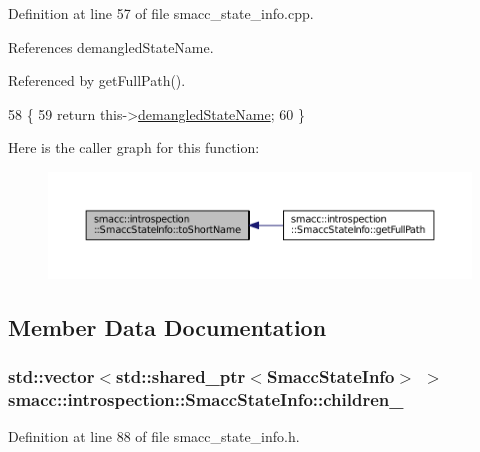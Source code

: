 Definition at line 57 of file smacc\+\_\+state\+\_\+info.\+cpp.



References demangled\+State\+Name.



Referenced by get\+Full\+Path().


\begin{DoxyCode}
58 \{
59     \textcolor{keywordflow}{return} this->\hyperlink{classsmacc_1_1introspection_1_1SmaccStateInfo_acf0014a819c23caad085ba6df13a17bf}{demangledStateName};
60 \}
\end{DoxyCode}


Here is the caller graph for this function\+:
\nopagebreak
\begin{figure}[H]
\begin{center}
\leavevmode
\includegraphics[width=350pt]{classsmacc_1_1introspection_1_1SmaccStateInfo_aa43c3733427618a141c3f6803913a88b_icgraph}
\end{center}
\end{figure}




\subsection{Member Data Documentation}
\subsubsection[{\texorpdfstring{children\+\_\+}{children_}}]{\setlength{\rightskip}{0pt plus 5cm}std\+::vector$<$std\+::shared\+\_\+ptr$<${\bf Smacc\+State\+Info}$>$ $>$ smacc\+::introspection\+::\+Smacc\+State\+Info\+::children\+\_\+}\hypertarget{classsmacc_1_1introspection_1_1SmaccStateInfo_a73eac049e8149b6eaeec735101c32ef9}{}\label{classsmacc_1_1introspection_1_1SmaccStateInfo_a73eac049e8149b6eaeec735101c32ef9}


Definition at line 88 of file smacc\+\_\+state\+\_\+info.\+h.



